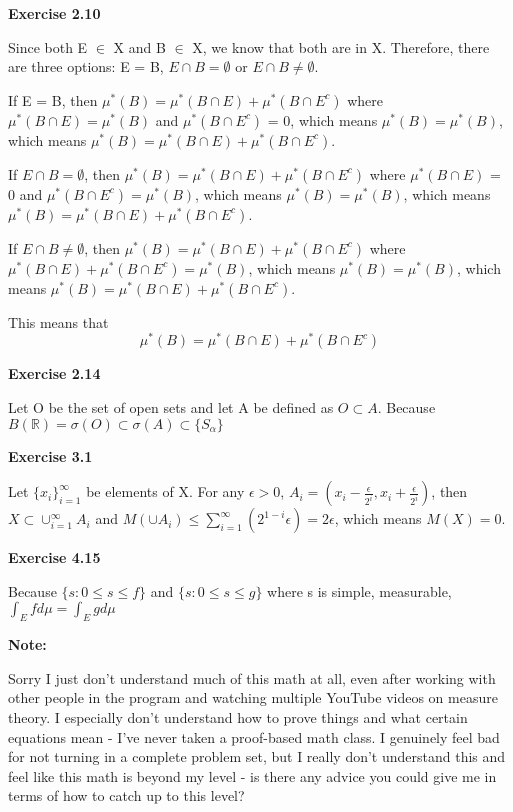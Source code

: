 \documentclass[letterpaper,12pt]{article}
\theoremstyle{definition}
\begin{document}
\noindent\textbf{Exercise 2.10} 
\begin{description}
\item Since both E $\in$ X and B $\in$ X, we know that both are in X. Therefore, there are three options: E = B, $E \cap B = \emptyset$ or $E \cap B \neq \emptyset$.

If E = B, then $\mu^*(B) = \mu^*(B \cap E) + \mu^*(B \cap E^c)$ where $\mu^*(B \cap E) = \mu^*(B)$ and $\mu^*(B \cap E^c)$ = 0, which means $\mu^*(B) = \mu^*(B)$, which means $\mu^*(B) = \mu^*(B \cap E) + \mu^*(B \cap E^c)$.

If $E \cap B = \emptyset$, then $\mu^*(B) = \mu^*(B \cap E) + \mu^*(B \cap E^c)$ where $\mu^*(B \cap E)$ = 0 and $\mu^*(B \cap E^c) = \mu^*(B)$, which means $\mu^*(B) = \mu^*(B)$, which means $\mu^*(B) = \mu^*(B \cap E) + \mu^*(B \cap E^c)$.

If $E \cap B \neq \emptyset$, then $\mu^*(B) = \mu^*(B \cap E) + \mu^*(B \cap E^c)$ where $\mu^*(B \cap E) + \mu^*(B \cap E^c) = \mu^*(B)$, which means $\mu^*(B) = \mu^*(B)$, which means $\mu^*(B) = \mu^*(B \cap E) + \mu^*(B \cap E^c)$.

This means that \[\mu^*(B) = \mu^*(B \cap E) + \mu^*(B \cap E^c)\]
\end{description}

\noindent\textbf{Exercise 2.14} 
\begin{description}
\item Let O be the set of open sets and let A be defined as $O \subset A$. Because $B(\mathbb{R}) = \sigma(O) \subset \sigma(A) \subset \{S_\alpha\}$
\end{description}

\noindent\textbf{Exercise 3.1} 
\begin{description}
\item Let $\{x_i\}_{i=1}^\infty$ be elements of X. For any $\epsilon > 0$, $A_i = (x_i - \frac{\epsilon}{2^i}, x_i + \frac{\epsilon}{2^i})$, then $X \subset \cup_{i=1}^\infty A_i$ and $M(\cup A_i) \leq \sum_{i=1}^\infty (2^{1-i}\epsilon) = 2\epsilon$, which means $M(X) = 0$.
\end{description}

\noindent\textbf{Exercise 4.15} 
\begin{description}
\item Because $\{s : 0 \leq s \leq f \}$ and $\{s : 0 \leq s \leq g \}$ where s is simple, measurable, $\int_E f d\mu = \int_E g d\mu$
\end{description}

\noindent\textbf{Note:} 
\begin{description}
\item Sorry I just don't understand much of this math at all, even after working with other people in the program and watching multiple YouTube videos on measure theory. I especially don't understand how to prove things and what certain equations mean - I've never taken a proof-based math class. I genuinely feel bad for not turning in a complete problem set, but I really don't understand this and feel like this math is beyond my level - is there any advice you could give me in terms of how to catch up to this level? 
\end{description}
\end{document}
